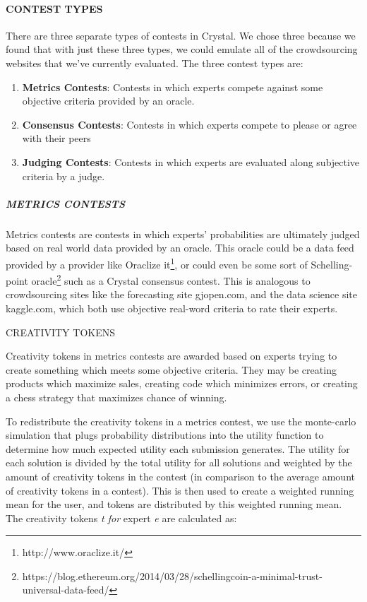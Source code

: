 \paragraph{CONTEST TYPES}\label{contest-types}

There are three separate types of contests in Crystal. We chose three
because we found that with just these three types, we could emulate all
of the crowdsourcing websites that we've currently evaluated. The three
contest types are:

\begin{enumerate}
\def\labelenumi{\arabic{enumi}.}
\item
  \textbf{Metrics Contests}: Contests in which experts compete against
  some objective criteria provided by an oracle.
\item
  \textbf{Consensus Contests}: Contests in which experts compete to
  please or agree with their peers
\item
  \textbf{Judging Contests}: Contests in which experts are evaluated
  along subjective criteria by a judge.
\end{enumerate}

\subparagraph{METRICS CONTESTS}\label{metrics-contests}

Metrics contests are contests in which experts' probabilities are
ultimately judged based on real world data provided by an oracle. This
oracle could be a data feed provided by a provider like Oraclize
it\footnote{http://www.oraclize.it/}, or could even be some sort of
Schelling-point oracle\footnote{https://blog.ethereum.org/2014/03/28/schellingcoin-a-minimal-trust-universal-data-feed/}
such as a Crystal consensus contest. This is analogous to crowdsourcing
sites like the forecasting site gjopen.com, and the data science site
kaggle.com, which both use objective real-word criteria to rate their
experts.

CREATIVITY TOKENS

Creativity tokens in metrics contests are awarded based on experts
trying to create something which meets some objective criteria. They may
be creating products which maximize sales, creating code which minimizes
errors, or creating a chess strategy that maximizes chance of winning.

To redistribute the creativity tokens in a metrics contest, we use the
monte-carlo simulation that plugs probability distributions into the
utility function to determine how much expected utility each submission
generates. The utility for each solution is divided by the total utility
for all solutions and weighted by the amount of creativity tokens in the
contest (in comparison to the average amount of creativity tokens in a
contest). This is then used to create a weighted running mean for the
user, and tokens are distributed by this weighted running mean. The
creativity tokens \emph{t for} expert \emph{e} are calculated as:

